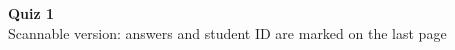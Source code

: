 \begin{center}
{\LARGE\bfseries Quiz 1}\\[2pt]
{\color{gray}Scannable version: answers and student ID are marked on the last page}
\end{center}
